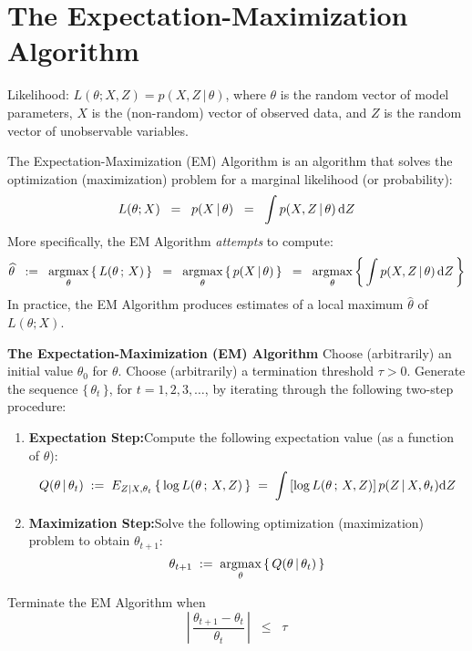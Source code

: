 \section{The Expectation-Maximization Algorithm}
\setcounter{theorem}{0}
\setcounter{equation}{0}


Likelihood: $L(\theta;X,Z) = p(X,Z\,|\,\theta)$, where $\theta$ is the random vector of model
parameters, $X$ is the (non-random) vector of observed data, and $Z$ is the random vector of
unobservable variables.

The Expectation-Maximization (EM) Algorithm is an algorithm that solves the optimization
(maximization) problem for a marginal likelihood (or probability):
\begin{equation*}
L(\theta;X) \;\; = \;\; p(X\,|\,\theta) \;\; = \;\; \int p(X,Z\,|\,\theta) \,\textnormal{d}Z
\end{equation*}
More specifically, the EM Algorithm \textit{attempts} to compute:
\begin{equation*}
\widehat{\theta}
\;\; := \;\;
\underset{\theta}{\textnormal{argmax}}\left\{\,L(\theta\,;\,X)\,\right\}
\;\; = \;\;
\underset{\theta}{\textnormal{argmax}}\left\{\,p(X\,|\,\theta)\,\right\}
\;\; = \;\;
\underset{\theta}{\textnormal{argmax}}\left\{\,\int p(X,Z\,|\,\theta) \,\textnormal{d}Z\,\right\}
\end{equation*}
In practice, the EM Algorithm produces estimates of a local maximum $\widehat{\theta}$ of $L(\theta;X)$.

\vskip 1.0cm
\noindent
\textbf{The Expectation-Maximization (EM) Algorithm}
\vskip 0.3cm
\noindent
Choose (arbitrarily) an initial value $\theta_{0}$ for $\theta$.
Choose (arbitrarily) a termination threshold $\tau > 0$.
Generate the sequence $\{\,\theta_{t}\,\}$, for $t = 1, 2, 3, \ldots$, by iterating through the following
two-step procedure:
\begin{enumerate}
\item	\textbf{Expectation Step:}\quad Compute the following expectation value (as a function of $\theta$):
		\begin{equation}
		\label{EM:ExpectationStep}
		Q(\theta\,|\,\theta_{t})
		\; := \;
		E_{Z|X,\theta_{t}}\left\{\,\log L(\theta\,;\,X,Z)\,\right\}
		\; = \;
		\int \left[\log L(\theta\,;\,X,Z)\right] p(Z\,|\,X,\theta_{t}) \textnormal{d}Z
		\end{equation}
\item	\textbf{Maximization Step:}\quad Solve the following optimization (maximization) problem to obtain
		$\theta_{t+1}$:
		\begin{equation}
		\label{EM:MaximizationStep}
		\theta_{t+1} \; := \;
		\underset{\theta}{\textnormal{argmax}}\left\{\,Q(\theta\,|\,\theta_{t})\,\right\}
		\end{equation}
\end{enumerate}
Terminate the EM Algorithm when
\begin{equation}
\label{EM:terminationCriterion}
\left\vert\,\dfrac{\theta_{t+1}-\theta_{t}}{\theta_{t}}\,\right\vert
\;\; \leq \;\; \tau
\end{equation}
\vskip 1.0cm

